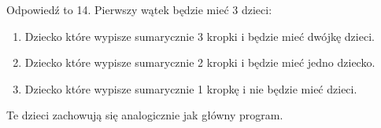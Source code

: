 Odpowiedź to 14. Pierwszy wątek będzie mieć 3 dzieci:
\begin{enumerate}
	\item Dziecko które wypisze sumarycznie 3 kropki i będzie mieć dwójkę dzieci.
	\item Dziecko które wypisze sumarycznie 2 kropki i będzie mieć jedno dziecko.
	\item Dziecko które wypisze sumarycznie 1 kropkę i nie będzie mieć dzieci.
\end{enumerate}
Te dzieci zachowują się analogicznie jak główny program.

